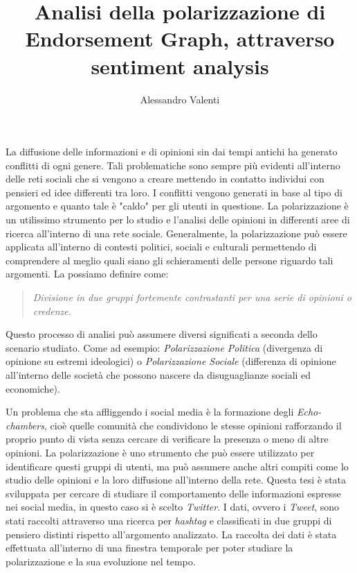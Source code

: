\documentclass[a4paper,12pt]{article}
\title{Analisi della polarizzazione di Endorsement Graph, attraverso sentiment analysis}
\date{}
\author{Alessandro Valenti}
\begin{document}
\maketitle
\vspace{30pt}

La diffusione delle informazioni e di opinioni sin dai tempi antichi ha generato conflitti di ogni genere. Tali problematiche sono sempre più evidenti all'interno delle reti sociali che si vengono a creare mettendo in contatto individui con pensieri ed idee differenti tra loro. I conflitti vengono generati in base al tipo di argomento e quanto tale è "caldo" per gli utenti in questione. 
La polarizzazione è un utilissimo strumento per lo studio e l'analisi delle opinioni in differenti aree di ricerca all'interno di una rete sociale. Generalmente, la polarizzazione può essere applicata all'interno di contesti politici, sociali e culturali permettendo di comprendere al meglio quali siano  gli schieramenti delle persone riguardo tali argomenti. La possiamo definire come:
\begin{quote}
 \textit{Divisione in due gruppi fortemente contrastanti per una serie di opinioni o credenze.}
\end{quote}

Questo processo di analisi può assumere diversi significati a seconda dello scenario studiato. Come ad esempio:
\textit{Polarizzazione Politica} (divergenza di opinione su estremi ideologici) o \textit{Polarizzazione Sociale} (differenza di opinione all'interno delle società che possono nascere da disuguaglianze sociali ed economiche).

Un problema che sta affliggendo i social media è la formazione degli \textit{Echo-chambers}, cioè quelle comunità che condividono le stesse opinioni rafforzando il proprio punto di vista senza cercare di verificare la presenza o meno di altre opinioni. La polarizzazione è uno strumento che può essere utilizzato per identificare questi gruppi di utenti, ma può assumere anche altri compiti come lo studio delle opinioni e la loro diffusione all'interno della rete.
Questa tesi è stata sviluppata per cercare di studiare il comportamento delle informazioni espresse nei social media, in questo caso si è scelto \textit{Twitter}. 
I dati, ovvero i \textit{Tweet}, sono stati raccolti attraverso una ricerca per \textit{hashtag} e classificati in due gruppi di pensiero distinti rispetto all'argomento analizzato.
La raccolta dei dati è stata effettuata all'interno di una finestra temporale per poter studiare la polarizzazione e la sua evoluzione nel tempo.
\end{document}
